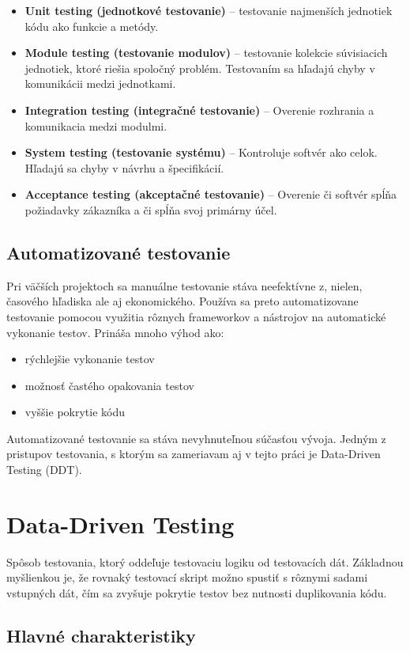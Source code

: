 \begin{itemize}
\item \textbf{Unit testing (jednotkové testovanie)} -- testovanie najmenších jednotiek kódu ako funkcie a metódy.
\item \textbf{Module testing (testovanie modulov)} -- testovanie kolekcie súvisiacich jednotiek, ktoré riešia spoločný problém. Testovaním sa hľadajú chyby v komunikácii medzi jednotkami.
\item \textbf{Integration testing (integračné testovanie)} -- Overenie rozhrania a komunikacia medzi modulmi.
\item \textbf{System testing (testovanie systému)} -- Kontroluje softvér ako celok. Hľadajú sa chyby v návrhu a špecifikácií.
\item \textbf{Acceptance testing  (akceptačné testovanie)} -- Overenie či softvér spĺňa požiadavky zákazníka a či spĺňa svoj primárny účel. 
\end{itemize}

\subsection{Automatizované testovanie}
Pri väčších projektoch sa manuálne testovanie stáva neefektívne z, nielen, časového hľadiska ale aj ekonomického. Používa sa preto automatizovane testovanie pomocou využitia rôznych frameworkov a nástrojov na automatické vykonanie testov. Prináša mnoho výhod ako:
\begin{itemize}
    \item rýchlejšie vykonanie testov
    \item možnosť častého opakovania testov
    \item vyššie pokrytie kódu
\end{itemize}
Automatizované testovanie sa stáva nevyhnuteľnou súčasťou vývoja. Jedným z pristupov  testovania, s ktorým sa zameriavam aj v tejto práci je Data-Driven Testing (DDT).

\section{Data-Driven Testing}
Spôsob testovania, ktorý oddeľuje testovaciu logiku od testovacích dát.\cite{Laukkanen2006} Základnou myšlienkou je, že rovnaký testovací skript možno spustiť s rôznymi sadami vstupných dát, čím sa  zvyšuje pokrytie testov bez nutnosti duplikovania kódu.\cite{Myers2011}

\subsection{Hlavné charakteristiky}

